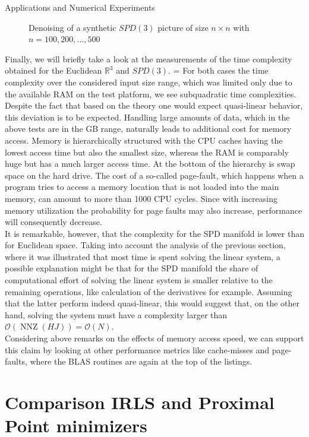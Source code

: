 \begin{chapter}{Applications and Numerical Experiments}
\begin{figure}[h!]
{	 Denoising of a synthetic $SPD(3)$ picture of size $n\times n$ with $n=100, 200, \ldots, 500$
	\label{fig:complexity}
    }
\end{figure}
Finally, we will briefly take a look at the measurements of the time complexity
obtained for the Euclidean $\mathbb{R}^3$ and $SPD(3)$. =
For both cases the time complexity over the considered input size range, which was limited only due to the available RAM on the test platform, we see subquadratic time complexities. Despite the fact that based on the theory one would expect
quasi-linear behavior, this deviation is to be expected. Handling large amounts of data, which in the above tests
are in the GB range, naturally leads to additional cost for memory access. Memory is hierarchically structured with the CPU caches 
having the lowest access time but also the smallest size, whereas the RAM is comparably huge but has a much larger access time. At the bottom
of the hierarchy is swap space on the hard drive. The cost of a so-called page-fault, which happens when a program tries to access
a memory location that is not loaded into the main memory, can amount to more than 1000 CPU cycles. Since with increasing memory
utilization the probability for page faults may also increase, performance will consequently decrease.\\

It is remarkable, however, that the complexity for the SPD manifold is lower than for Euclidean space. 
Taking into account the analysis of the previous section, where it was illustrated that most time is spent solving the linear system, a 
possible explanation might be that for the SPD manifold the share of computational effort of solving the linear system is smaller
relative to the remaining operations, like calculation of the derivatives for example. Assuming that the latter perform indeed
quasi-linear, this would suggest that, on the other hand, solving the system must have a complexity larger than 
$\mathcal{O}(\operatorname{NNZ}(HJ))=\mathcal{O}(N)$.\\

Considering above remarks on the effects of memory access speed, we can support this claim by looking at other performance metrics like
cache-misses and page-faults, where the BLAS routines are again at the top of the listings.


\FloatBarrier
\section{Comparison IRLS and Proximal Point minimizers} %
\label{sec:Comparison IRLS and Proximal Point minimizers}


\end{chapter}
